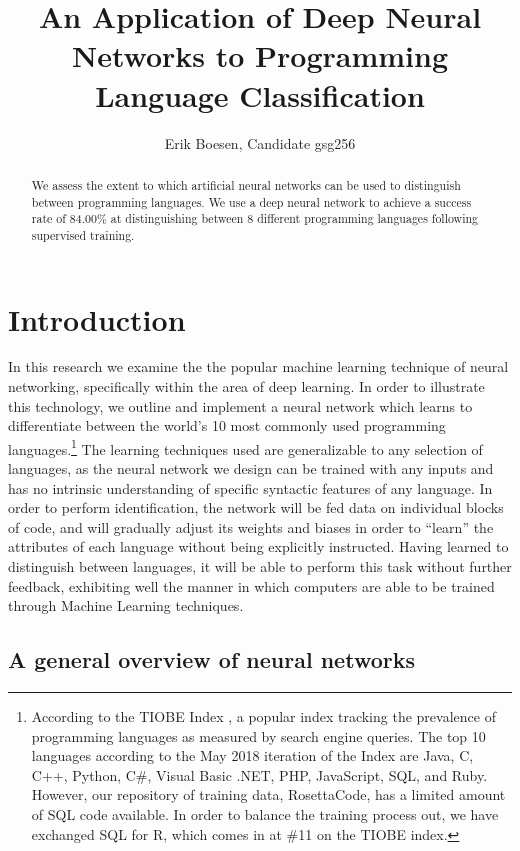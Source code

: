 \documentclass{article}
\begin{document}
\title{An Application of Deep Neural Networks to Programming Language Classification}
\author{Erik Boesen, Candidate gsg256}
\maketitle

\begin{abstract}
We assess the extent to which artificial neural networks can be used to distinguish between programming languages. We use a deep neural network to achieve a success rate of 84.00\% at distinguishing between 8 different programming languages following supervised training.
\end{abstract}

\section{Introduction}
In this research we examine the the popular machine learning technique of neural networking, specifically within the area of deep learning. In order to illustrate this technology, we outline and implement a neural network which learns to differentiate between the world's 10 most commonly used programming languages.\footnote{According to the TIOBE Index \cite{tiobe}, a popular index tracking the prevalence of programming languages as measured by search engine queries. The top 10 languages according to the May 2018 iteration of the Index are Java, C, C++, Python, C\#, Visual Basic .NET, PHP, JavaScript, SQL, and Ruby. However, our repository of training data, RosettaCode, has a limited amount of SQL code available. In order to balance the training process out, we have exchanged SQL for R, which comes in at \#11 on the TIOBE index.} The learning techniques used are generalizable to any selection of languages, as the neural network we design can be trained with any inputs and has no intrinsic understanding of specific syntactic features of any language. In order to perform identification, the network will be fed data on individual blocks of code, and will gradually adjust its weights and biases in order to ``learn'' the attributes of each language without being explicitly instructed. Having learned to distinguish between languages, it will be able to perform this task without further feedback, exhibiting well the manner in which computers are able to be trained through Machine Learning techniques.

\subsection{A general overview of neural networks}
\end{document}
